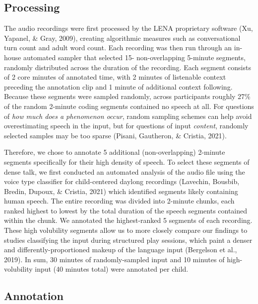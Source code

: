 \documentclass[
  man]{apa6}
\begin{document}
\hypertarget{processing}{%
\subsection{Processing}\label{processing}}

The audio recordings were first processed by the LENA proprietary software (Xu, Yapanel, \& Gray, 2009), creating algorithmic measures such as conversational turn count and adult word count. Each recording was then run through an in-house automated sampler that selected 15- non-overlapping 5-minute segments, randomly distributed across the duration of the recording. Each segment consists of 2 core minutes of annotated time, with 2 minutes of listenable context preceding the annotation clip and 1 minute of additional context following. Because these segments were sampled randomly, across participants roughly 27\% of the random 2-minute coding segments contained no speech at all. For questions of \emph{how much does a phenomenon occur}, random sampling schemes can help avoid overestimating speech in the input, but for questions of input \emph{content}, randomly selected samples may be too sparse (Pisani, Gautheron, \& Cristia, 2021).

Therefore, we chose to annotate 5 additional (non-overlapping) 2-minute segments specifically for their high density of speech. To select these segments of dense talk, we first conducted an automated analysis of the audio file using the voice type classifier for child-centered daylong recordings (Lavechin, Bousbib, Bredin, Dupoux, \& Cristia, 2021) which identified segments likely containing human speech. The entire recording was divided into 2-minute chunks, each ranked highest to lowest by the total duration of the speech segments contained within the chunk. We annotated the highest-ranked 5 segments of each recording. These high volubility segments allow us to more closely compare our findings to studies classifying the input during structured play sessions, which paint a denser and differently-proportioned makeup of the language input (Bergelson et al., 2019). In sum, 30 minutes of randomly-sampled input and 10 minutes of high-volubility input (40 minutes total) were annotated per child.

\hypertarget{annotation}{%
\subsection{Annotation}\label{annotation}}
\end{document}
